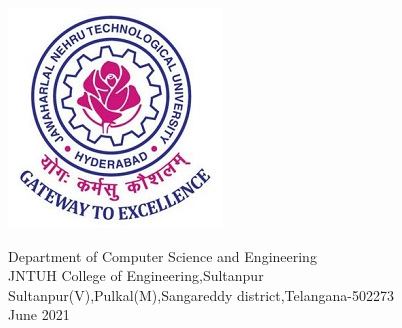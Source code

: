 \documentclass[12pt,a4paper]{report}
\begin{document}
\begin{titlepage}
\begin{center}
\begin{center}
			\includegraphics[scale=0.6]{logoj}
		\end{center}
\textup {\large{Department of Computer Science and Engineering}}\\
\normalsize
\textup {{JNTUH College of Engineering,Sultanpur}}\\
\vspace{0.04cm}
\textup{\footnotesize {Sultanpur(V),Pulkal(M),Sangareddy district,Telangana-502273 }}\\[.23cm]
\textup{\small{June 2021}}
\end{center}
\end{titlepage}
	
\end{document}
